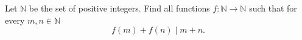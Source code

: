 Let $\mathbb{N}$ be the set of positive integers.
Find all functions $f\colon\mathbb{N}\to\mathbb{N}$ such that for every $m,n\in\mathbb{N}$
$$f(m)+f(n)\mid m+n.$$
